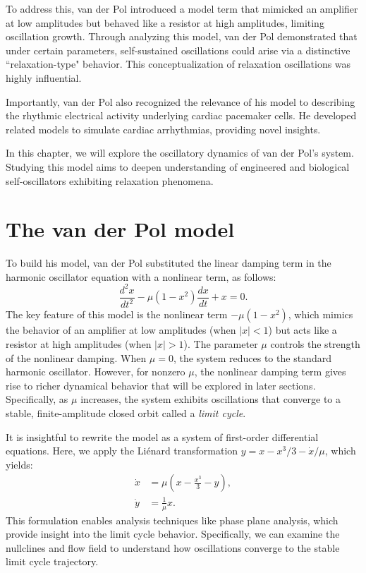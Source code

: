 To address this, van der Pol introduced a model term that mimicked an amplifier at low amplitudes but behaved like a resistor at high amplitudes, limiting oscillation growth. Through analyzing this model, van der Pol demonstrated that under certain parameters, self-sustained oscillations could arise via a distinctive ``relaxation-type" behavior. This conceptualization of relaxation oscillations was highly influential.

Importantly, van der Pol also recognized the relevance of his model to describing the rhythmic electrical activity underlying cardiac pacemaker cells. He developed related models to simulate cardiac arrhythmias, providing novel insights.

In this chapter, we will explore the oscillatory dynamics of van der Pol's system. Studying this model aims to deepen understanding of engineered and biological self-oscillators exhibiting relaxation phenomena.

\section{The van der Pol model}

To build his model, van der Pol substituted the linear damping term in the harmonic oscillator equation with a nonlinear term, as follows:
\begin{equation*}
\frac{d^2x}{dt^2} - \mu(1 - x^2) \frac{dx}{dt} + x = 0.
\end{equation*}
The key feature of this model is the nonlinear term $-\mu(1-x^2)$, which mimics the behavior of an amplifier at low amplitudes (when $|x|<1$) but acts like a resistor at high amplitudes (when $|x|>1$). The parameter $\mu$ controls the strength of the nonlinear damping. When $\mu = 0$, the system reduces to the standard harmonic oscillator. However, for nonzero $\mu$, the nonlinear damping term gives rise to richer dynamical behavior that will be explored in later sections. Specifically, as $\mu$ increases, the system exhibits oscillations that converge to a stable, finite-amplitude closed orbit called a \textit{limit cycle}.

It is insightful to rewrite the model as a system of first-order differential equations. Here, we apply the Liénard transformation $y = x - x^3/3 - \dot{x}/\mu$, which yields:
\begin{align}
    \dot{x} & = \mu \left( x - \frac{x^3}{3} - y\right), \label{eq:19.01}\\
    \dot{y} & = \frac{1}{\mu} x. \label{eq:19.02}
\end{align}
This formulation enables analysis techniques like phase plane analysis, which provide insight into the limit cycle behavior. Specifically, we can examine the nullclines and flow field to understand how oscillations converge to the stable limit cycle trajectory.


